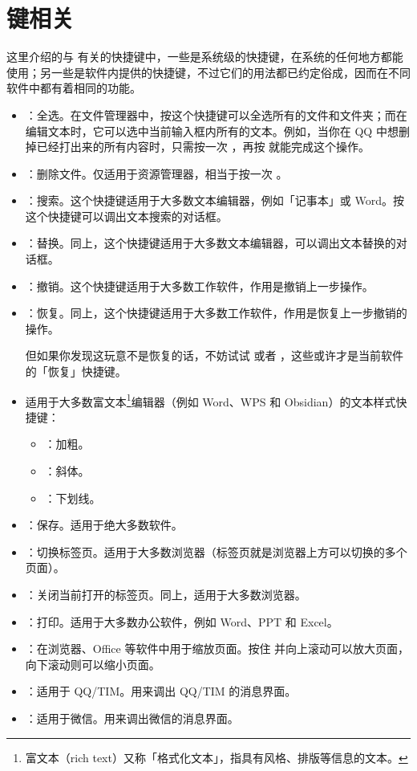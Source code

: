 \section{ 键相关}

这里介绍的与  有关的快捷键中，一些是系统级的快捷键，在系统的任何地方都能使用；另一些是软件内提供的快捷键，不过它们的用法都已约定俗成，因而在不同软件中都有着相同的功能。

\begin{itemize}
  \item {}：全选。在文件管理器中，按这个快捷键可以全选所有的文件和文件夹；而在编辑文本时，它可以选中当前输入框内所有的文本。例如，当你在 QQ 中想删掉已经打出来的所有内容时，只需按一次 ，再按  就能完成这个操作。
  \item {}：删除文件。仅适用于资源管理器，相当于按一次 。
  \item {}：搜索。这个快捷键适用于大多数文本编辑器，例如「记事本」或 Word。按这个快捷键可以调出文本搜索的对话框。
  \item {}：替换。同上，这个快捷键适用于大多数文本编辑器，可以调出文本替换的对话框。
  \item {}：撤销。这个快捷键适用于大多数工作软件，作用是撤销上一步操作。
  \item {}：恢复。同上，这个快捷键适用于大多数工作软件，作用是恢复上一步撤销的操作。
  
  但如果你发现这玩意不是恢复的话，不妨试试  或者 ，这些或许才是当前软件的「恢复」快捷键。

  \item 适用于大多数富文本\footnote{富文本（rich text）又称「格式化文本」，指具有风格、排版等信息的文本。}编辑器（例如 Word、WPS 和 Obsidian）的文本样式快捷键：
  \begin{itemize}
    \item {}：加粗。
    \item {}：斜体。
    \item {}：下划线。
  \end{itemize}
  \item {}：保存。适用于绝大多数软件。
  \item {}：切换标签页。适用于大多数浏览器（标签页就是浏览器上方可以切换的多个页面）。
  \item {}：关闭当前打开的标签页。同上，适用于大多数浏览器。
  \item {}：打印。适用于大多数办公软件，例如 Word、PPT 和 Excel。
  \item {}：在浏览器、Office 等软件中用于缩放页面。按住  并向上滚动可以放大页面，向下滚动则可以缩小页面。
  \item {}：适用于 QQ/TIM。用来调出 QQ/TIM 的消息界面。
  \item {}：适用于微信。用来调出微信的消息界面。
\end{itemize}

